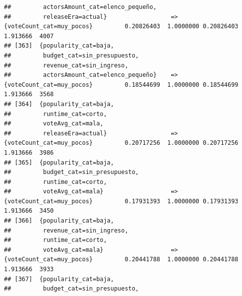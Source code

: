 \documentclass[
]{article}
\begin{document}
\begin{verbatim}
##         actorsAmount_cat=elenco_pequeño,                                                                                        
##         releaseEra=actual}                  => {voteCount_cat=muy_pocos}         0.20826403  1.0000000 0.20826403 1.913666  4007
## [363]  {popularity_cat=baja,                                                                                                    
##         budget_cat=sin_presupuesto,                                                                                             
##         revenue_cat=sin_ingreso,                                                                                                
##         actorsAmount_cat=elenco_pequeño}    => {voteCount_cat=muy_pocos}         0.18544699  1.0000000 0.18544699 1.913666  3568
## [364]  {popularity_cat=baja,                                                                                                    
##         runtime_cat=corto,                                                                                                      
##         voteAvg_cat=mala,                                                                                                       
##         releaseEra=actual}                  => {voteCount_cat=muy_pocos}         0.20717256  1.0000000 0.20717256 1.913666  3986
## [365]  {popularity_cat=baja,                                                                                                    
##         budget_cat=sin_presupuesto,                                                                                             
##         runtime_cat=corto,                                                                                                      
##         voteAvg_cat=mala}                   => {voteCount_cat=muy_pocos}         0.17931393  1.0000000 0.17931393 1.913666  3450
## [366]  {popularity_cat=baja,                                                                                                    
##         revenue_cat=sin_ingreso,                                                                                                
##         runtime_cat=corto,                                                                                                      
##         voteAvg_cat=mala}                   => {voteCount_cat=muy_pocos}         0.20441788  1.0000000 0.20441788 1.913666  3933
## [367]  {popularity_cat=baja,                                                                                                    
##         budget_cat=sin_presupuesto,                                                                                             

\end{verbatim}
\end{document}

